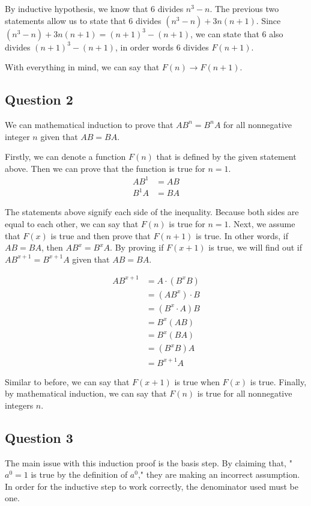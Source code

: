 \documentclass[letterpaper, 12pt]{article}
\begin{document}
By inductive hypothesis, we know that 6 divides $n^3 - n$. The previous two statements allow us to state that 6 divides $(n^3 - n) + 3n(n+1)$. Since $(n^3 - n) + 3n(n+1) = (n + 1)^3 - (n + 1)$, we can state that 6 also divides $(n + 1)^3 - (n + 1)$, in order words 6 divides $F(n + 1)$.

With everything in mind, we can say that $F(n) \to F(n + 1)$.

\subsection*{Question 2}
We can mathematical induction to prove that $AB^n = B^nA$ for all nonnegative integer $n$ given that $AB = BA$. 

Firstly, we can denote a function $F(n)$ that is defined by the given statement above. Then we can prove that the function is true for $n = 1$.
\begin{align*}
    AB^1 &= AB\\
    B^1A &= BA
\end{align*}

The statements above signify each side of the inequality. Because both sides are equal to each other, we can say that $F(n)$ is true for $n = 1$. Next, we assume that $F(x)$ is true and then prove that $F(n + 1)$ is true. In other words, if $AB = BA$, then $AB^x = B^xA$. By proving if $F(x + 1)$ is true, we will find out if $AB^{x + 1} = B^{x + 1}A$ given that $AB = BA$.

\begin{align*}
    AB^{x + 1} &= A \cdot (B^xB)\\
    &= (AB^x) \cdot B\\
    &= (B^x \cdot A)B\\
    &= B^x(AB)\\
    &= B^x(BA)\\
    &= (B^xB)A\\
    &= B^{x + 1}A
\end{align*}

Similar to before, we can say that $F(x + 1)$ is true when $F(x)$ is true. Finally, by mathematical induction, we can say that $F(n)$ is true for all nonnegative integers $n$.

\subsection*{Question 3}
The main issue with this induction proof is the basis step. By claiming that, "$a^0 = 1$ is true by the definition of $a^0$," they are making an incorrect assumption. In order for the inductive step to work correctly, the denominator used must be one.
\end{document}
